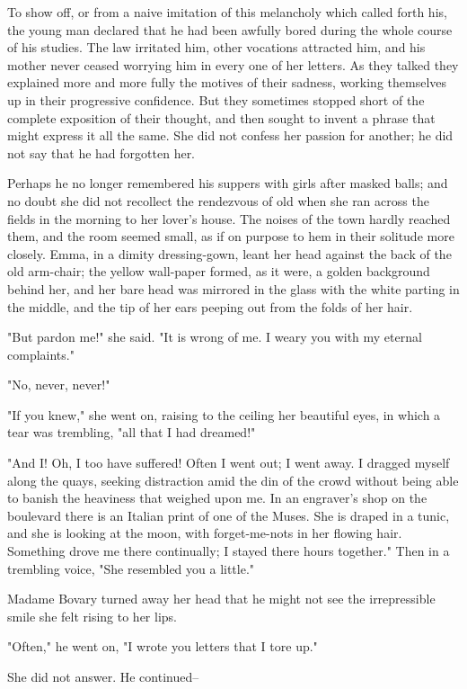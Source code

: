 \documentclass[11pt,twocolumn]{ltugboat}
\begin{document}
To show off, or from a naive imitation of this melancholy which called
forth his, the young man declared that he had been awfully bored during
the whole course of his studies. The law irritated him, other vocations
attracted him, and his mother never ceased worrying him in every one
of her letters. As they talked they explained more and more fully the
motives of their sadness, working themselves up in their progressive
confidence. But they sometimes stopped short of the complete exposition
of their thought, and then sought to invent a phrase that might express
it all the same. She did not confess her passion for another; he did not
say that he had forgotten her.

Perhaps he no longer remembered his suppers with girls after masked
balls; and no doubt she did not recollect the rendezvous of old when she
ran across the fields in the morning to her lover's house. The noises
of the town hardly reached them, and the room seemed small, as if
on purpose to hem in their solitude more closely. Emma, in a dimity
dressing-gown, leant her head against the back of the old arm-chair; the
yellow wall-paper formed, as it were, a golden background behind her,
and her bare head was mirrored in the glass with the white parting in
the middle, and the tip of her ears peeping out from the folds of her
hair.

"But pardon me!" she said. "It is wrong of me. I weary you with my
eternal complaints."

"No, never, never!"

"If you knew," she went on, raising to the ceiling her beautiful eyes,
in which a tear was trembling, "all that I had dreamed!"

"And I! Oh, I too have suffered! Often I went out; I went away. I
dragged myself along the quays, seeking distraction amid the din of the
crowd without being able to banish the heaviness that weighed upon me.
In an engraver's shop on the boulevard there is an Italian print of one
of the Muses. She is draped in a tunic, and she is looking at the
moon, with forget-me-nots in her flowing hair. Something drove me there
continually; I stayed there hours together." Then in a trembling voice,
"She resembled you a little."

Madame Bovary turned away her head that he might not see the
irrepressible smile she felt rising to her lips.

"Often," he went on, "I wrote you letters that I tore up."

She did not answer. He continued--
\end{document}
